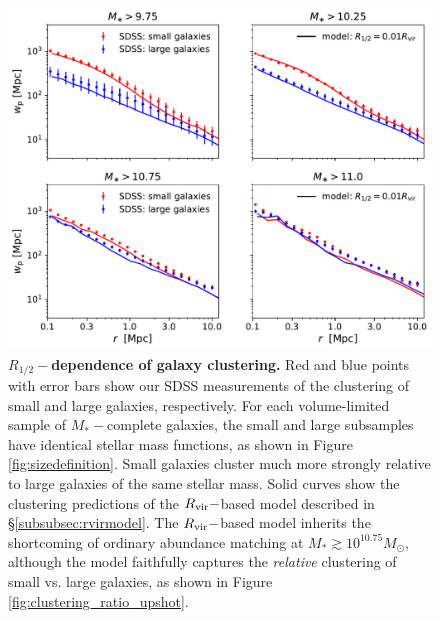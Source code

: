 \documentclass[usenatbib,usegraphicx,letterpaper]{mn2e}
\newcommand{\rhalf}{R_{1/2}}
\newcommand{\mstar}{M_{\ast}}
\newcommand{\rvir}{R_{\rm vir}}
\newcommand{\msun}{M_\odot}
\begin{document}
\begin{figure}
\centering
\includegraphics[width=12cm]{FIGS/rvir_only_wp_large_small_absolute.pdf}
\caption{
{\bf $\rhalf-$dependence of galaxy clustering.}
Red and blue points with error bars show our SDSS measurements of the clustering of small and large galaxies, respectively. For each volume-limited sample of $\mstar-$complete galaxies, the small and large subsamples have identical stellar mass functions, as shown in Figure \ref{fig:sizedefinition}. Small galaxies cluster much more strongly relative to large galaxies of the same stellar mass. Solid curves show the clustering predictions of the $\rvir-$based model described in \S\ref{subsubsec:rvirmodel}. The $\rvir-$based model inherits the shortcoming of ordinary abundance matching at $\mstar\gtrsim10^{10.75}\msun,$ although the model faithfully captures the {\em relative} clustering of small vs. large galaxies, as shown in Figure \ref{fig:clustering_ratio_upshot}.
}
\label{fig:rvir_only_clustering_absolute}
\end{figure}
\end{document}
